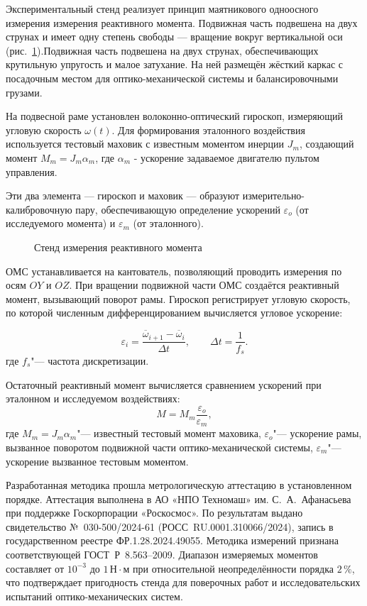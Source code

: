 Экспериментальный стенд реализует принцип маятникового одноосного измерения измерения реактивного момента.
Подвижная часть подвешена на двух струнах и имеет одну степень свободы — вращение вокруг вертикальной оси (рис.~\cref{fig:yoiom}).Подвижная часть подвешена на двух струнах, обеспечивающих крутильную упругость и малое затухание. На ней размещён жёсткий каркас с посадочным местом для оптико-механической системы и балансировочными грузами. 

На подвесной раме установлен волоконно-оптический гироскоп, измеряющий угловую скорость $\omega(t)$. Для формирования эталонного воздействия используется тестовый маховик с известным моментом инерции $J_m$, создающий момент $M_m=J_m\alpha_m$, где $\alpha_m$ - ускорение задаваемое двигателю пультом управления.

Эти два элемента — гироскоп и маховик — образуют измерительно-калибровочную пару, обеспечивающую определение ускорений $\varepsilon_o$ (от исследуемого момента) и $\varepsilon_m$ (от эталонного).

\begin{figure}[!h] 
	\caption{Стенд измерения реактивного момента}
	\label{fig:yoiom} 
\end{figure}

ОМС устанавливается на кантователь, позволяющий проводить измерения по осям $OY$ и $OZ$.
При вращении подвижной части ОМС создаётся реактивный момент, вызывающий поворот рамы. Гироскоп регистрирует угловую скорость, по которой численным дифференцированием вычисляется угловое ускорение:

\begin{equation*}
	\label{eq:mean_acc}
	\varepsilon_{i}
	= \frac{\overline{\omega}_{i+1}-\overline{\omega}_{i}}{\Delta t},
	\qquad
	\Delta t = \frac{1}{f_s}.
\end{equation*}
где \(f_s\)"--- частота дискретизации.

Остаточный реактивный момент вычисляется сравнением ускорений при эталонном и исследуемом воздействиях:
\begin{equation*}
	M = M_m\frac{\varepsilon_o}{\varepsilon_m},
\end{equation*}
где \(M_m = J_m\alpha_m\)"--- известный тестовый момент маховика, \(\varepsilon_o\)"--- ускорение рамы, вызванное поворотом подвижной части оптико-механической системы, \(\varepsilon_m\)"--- ускорение вызванное тестовым моментом.


Разработанная методика прошла метрологическую аттестацию
в установленном порядке. Аттестация выполнена в АО «НПО Техномаш»
им. С.~А.~Афанасьева при поддержке Госкорпорации «Роскосмос».
По результатам выдано свидетельство №~030-500/2024-61
(РОСС~RU.0001.310066/2024), запись в государственном реестре
ФР.1.28.2024.49055. Методика измерений признана соответствующей
ГОСТ~Р~8.563–2009. Диапазон измеряемых моментов составляет
от $10^{-3}$ до $1\,\text{Н}\cdot\text{м}$ при относительной
неопределённости порядка $2\,\%$, что подтверждает пригодность стенда
для поверочных работ и исследовательских испытаний оптико-механических систем.

